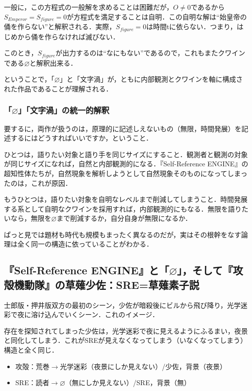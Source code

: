 \documentclass[10pt, a5paper, twoside]{jsarticle}
\begin{document}
				一般に，この方程式の一般解を求めることは困難だが，$ O \neq 0 $であるから$ S_{Emperor} = S_{figure} = 0 $が方程式を満足することは自明．この自明な解は“始皇帝の俑を作らない”と解釈される．実際，$ S_{figure} = 0 $は時間tに依らない．つまり，はじめから俑を作らなければ滅びない．

				このとき，$ S_{figure} $が出力するのは“なにもない”であるので，これもまたクワインである$ \varnothing $と解釈出来る．

				ということで，「$ \varnothing $」と「文字渦」が，ともに内部観測とクワインを軸に構成された作品であることが理解される．

			\subsubsection{「$ \varnothing $」「文字渦」の統一的解釈}

				要するに，両作が扱うのは，原理的に記述しえないもの（無限，時間発展）を記述するにはどうすればいいですか，ということ．

				ひとつは，語りたい対象と語り手を同じサイズにすること．観測者と観測の対象が同じサイズになれば，自然と内部観測的になる．『Self-Reference ENGINE』の超知性体たちが，自然現象を解析しようとして自然現象そのものになってしまったのは，これが原因．

				もうひとつは，語りたい対象を自明なレベルまで削減してしまうこと．時間発展する系として自明なクワインを採用すれば，内部観測的にもなる．無限を語りたいなら，無限を$ \varnothing $まで削減するか，自分自身が無限になるか．

				ぱっと見では題材も時代も規模もまったく異なるのだが，実はその根幹をなす論理は全く同一の構造に依っていることがわかる．

		\subsection{『Self-Reference ENGINE』と「$ \varnothing $」，そして『攻殻機動隊』の草薙少佐：SRE=草薙素子説}

			士郎版・押井版双方の最初のシーン，少佐が暗殺後にビルから飛び降り，光学迷彩で夜に溶け込んでいくシーン．これのイメージ．
			
			存在を探知されてしまった少佐は，光学迷彩で夜に見えるようにふるまい，夜景と同化してしまう．これがSREが見えなくなってしまう（いなくなってしまう）構造と全く同じ．

			\begin{itemize}

				\item 攻殻：荒巻$ \rightarrow $光学迷彩（夜景にしか見えない）/少佐，背景（夜景）

				\item SRE：読者$ \rightarrow \varnothing$（無にしか見えない）/SRE，背景（無）

			\end{itemize}
\end{document}
